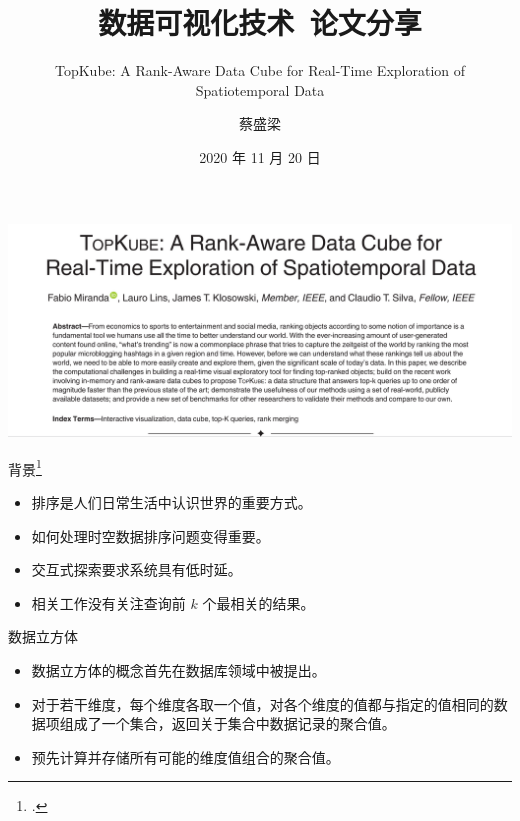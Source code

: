 \documentclass[10pt,aspectratio=169]{ctexbeamer}
\title{数据可视化技术\, 论文分享}
\subtitle{TopKube: A Rank-Aware Data Cube for Real-Time Exploration of Spatiotemporal Data}
\author{蔡盛梁}
\institute{华东师范大学计算机科学与技术学院}
\date{2020 年 11 月 20 日}
\begin{document}
\begin{frame}
    \titlepage
\end{frame}

\begin{frame}
    \begin{center}
        \includegraphics[width=.8\textwidth]{pic/paper.png}
    \end{center}
\end{frame}

\begin{frame}{背景\footcite{Miranda2018}}
    \begin{itemize}[<+->]
        \item 排序是人们日常生活中认识世界的重要方式。
        \item 如何处理时空数据排序问题变得重要。
        \item 交互式探索要求系统具有低时延。
        \item 相关工作没有关注查询前 $k$ 个最相关的结果。
    \end{itemize}
\end{frame}

\begin{frame}{数据立方体}
    \begin{itemize}[<+->]
        \item 数据立方体的概念首先在数据库领域中被提出。
        \item 对于若干维度，每个维度各取一个值，对各个维度的值都与指定的值相同的数据项组成了一个集合，返回关于集合中数据记录的聚合值。
        \item 预先计算并存储所有可能的维度值组合的聚合值。
    \end{itemize}
\end{frame}
\end{document}
